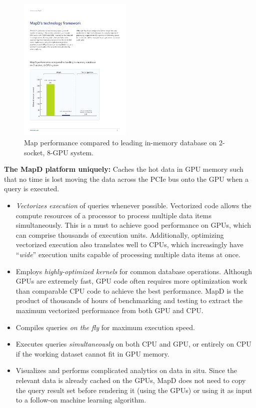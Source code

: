 \documentclass[twocolumn]{article}
\newcommand{\bi}{\begin{itemize}}
\newcommand{\ei}{\end{itemize}}
\newcommand{\ii}{\item}
\begin{document}
\begin{figure}[htb]
        \centering
        \includegraphics[width=0.48\textwidth]{mapd-graph.pdf}
        \caption{Map performance compared to leading in-memory database on 2-socket, 8-GPU system.}
        \label{fig:mapd-graph}
\end{figure}

\noindent
\textbf{The MapD platform uniquely:}
Caches the hot data in GPU memory such that no time is lost moving the data across the PCIe bus onto the GPU when a query is executed.

\bi
\ii \textit{Vectorizes execution} of queries whenever possible. Vectorized code allows the compute resources of a processor to process multiple data items simultaneously. This is a must to achieve good performance on GPUs, which can comprise thousands of execution units. Additionally, optimizing vectorized execution also translates well to CPUs, which increasingly have “\textit{wide}” execution units capable of processing multiple data items at once.
\ii Employs \textit{highly-optimized kernels} for common database operations. Although GPUs are extremely fast, GPU code often requires more optimization work than comparable CPU code to achieve the best performance. MapD is
the product of thousands of hours of benchmarking and testing to extract the maximum vectorized performance from both GPU and CPU.
\ii Compiles queries \textit{on the fly} for maximum execution speed.
\ii Executes queries \textit{simultaneously} on both CPU and GPU, or entirely on CPU if the working dataset cannot fit in GPU memory.
\ii Visualizes and performs complicated analytics on data in situ. Since the relevant data is already cached on the GPUs, MapD does not need to copy the query result set before rendering it (using the GPUs) or using it as input to a follow-on machine learning algorithm.
\ei
\end{document}
